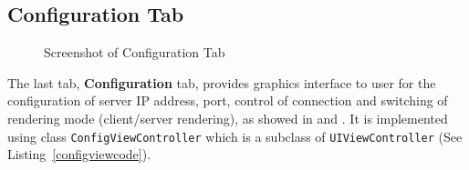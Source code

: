 \subsection{Configuration Tab}
\label{section:configuration}

\begin{figure}
\centering
{}
\hfill
{}
\label{fig:configtab}
\caption{Screenshot of Configuration Tab}
\end{figure}
The last tab, \textbf{Configuration} tab, provides graphics interface to user for the configuration of server IP address, port, control of connection and switching of rendering mode (client/server rendering), as showed in  and . It is implemented using class \texttt{ConfigViewController} which is a subclass of \texttt{UIViewController} (See Listing~\ref{configviewcode}). \\


